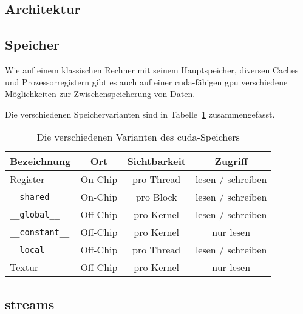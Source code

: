 \subsection{Architektur}\label{sssec:cu_arch}

\subsection{Speicher}\label{sssec:cu_mem}

Wie auf einem klassischen Rechner mit seinem Hauptspeicher, diversen Caches und Prozessorregistern gibt es auch auf
einer \gls{cuda}-fähigen \gls{gpu} verschiedene Möglichkeiten zur Zwischenspeicherung von Daten.

Die verschiedenen Speichervarianten sind in Tabelle~\ref{table:cu_mem_hierarchie} zusammengefasst.

\begin{table}
    \centering
    \begin{tabular}{| l | c | c | c |}
        \hline
        Bezeichnung & Ort & Sichtbarkeit & Zugriff\\
        \hline
        \hline
        Register & On-Chip & pro Thread & lesen / schreiben \\
        \hline
        \texttt{\_\_shared\_\_} & On-Chip & pro Block & lesen / schreiben \\
        \hline
        \texttt{\_\_global\_\_} & Off-Chip & pro Kernel & lesen / schreiben \\
        \hline
        \texttt{\_\_constant\_\_} & Off-Chip & pro Kernel & nur lesen \\
        \hline
        \texttt{\_\_local\_\_} & Off-Chip & pro Thread & lesen / schreiben\\
        \hline
        Textur & Off-Chip & pro Kernel & nur lesen\\
        \hline
    \end{tabular}
    \caption{Die verschiedenen Varianten des \gls{cuda}-Speichers}
    \label{table:cu_mem_hierarchie}
\end{table}

\subsection{\glspl{stream}}\label{ssec:cu_streams}
